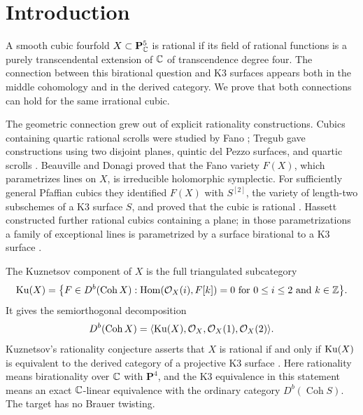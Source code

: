 \section{Introduction}\label{sec:introduction}

A smooth cubic fourfold \(X\subset\mathbf P^5_{\mathbb C}\) is rational if its field of rational functions is
a purely transcendental extension of \(\mathbb C\) of transcendence degree four. The connection
between this birational question and K3 surfaces appears both in the
middle cohomology and in the derived category. We prove that both
connections can hold for the same irrational cubic.

The geometric connection grew out of explicit rationality constructions.
Cubics containing quartic rational scrolls were studied by Fano
\cite[p.~72]{Fano43}; Tregub gave constructions using two disjoint
planes, quintic del Pezzo surfaces, and quartic scrolls
\cite[Sections~2--4]{Tregub84}.
Beauville and Donagi proved that the Fano variety \(F(X)\), which
parametrizes lines on \(X\), is irreducible holomorphic symplectic.
For sufficiently general Pfaffian cubics they identified \(F(X)\) with
\(S^{[2]}\), the variety of length-two subschemes of a K3 surface \(S\),
and proved that the cubic is rational
\cite[Propositions~1--2 and~5]{BeauvilleDonagi85}.
Hassett constructed further rational cubics containing a plane; in those
parametrizations a family of exceptional lines is parametrized by a
surface birational to a K3 surface
\cite[Theorem~4.2 and Proposition~5.1]{Hassett99}.

The Kuznetsov component of \(X\) is the full triangulated subcategory
\[
 \operatorname{Ku}(X)=\bigl\{F\in D^b(\operatorname{Coh}X):
 \operatorname{Hom}(\mathcal O_X(i),F[k])=0
 \text{ for }0\le i\le2\text{ and }k\in\mathbb Z\bigr\}.
\]
It gives the semiorthogonal decomposition
\[
 D^b(\operatorname{Coh}X)
 =\langle\operatorname{Ku}(X),\mathcal O_X,\mathcal O_X(1),\mathcal O_X(2)\rangle.
\]
Kuznetsov's rationality conjecture asserts that \(X\) is rational if and only
if \(\operatorname{Ku}(X)\) is equivalent to the derived category of a projective K3
surface \cite[Conjecture~1.1]{Kuznetsov10}. Here rationality means
birationality over \(\mathbb C\) with \(\mathbf P^4\), and the K3 equivalence in
this statement means an exact \(\mathbb C\)-linear equivalence with the ordinary category
\(D^b(\operatorname{Coh}S)\). The target has no Brauer twisting.

